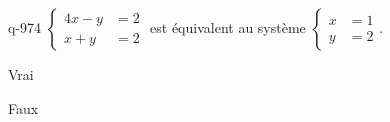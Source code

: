 \begin{truefalse}{q-974}
$\begin{cases}4x-y &= 2 \\ x+y &= 2\end{cases}$ est équivalent au système $\begin{cases}x&=1 \\ y&=2\end{cases}$.
\item Vrai
\item* Faux
\end{truefalse}

